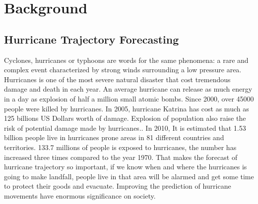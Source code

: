 \chapter{Background}
\label{sec:chapter2}

\section{Hurricane Trajectory Forecasting}
\label{sec:chapter2_1}
Cyclones, hurricanes or typhoons are words for the same phenomena: a rare and complex event characterized by strong winds surrounding a low pressure area. Hurricanes is one of the most severe natural disaster that cost tremendous damage and death in each year. An average hurricane can release as much energy in a day as explosion of half a million small atomic bombs. Since 2000, over 45000 people were killed by hurricanes. In 2005, hurricane Katrina has cost as much as 125 billions US Dollars worth of damage. Explosion of population also raise the risk of potential damage made by hurricanes.\cite{peduzzi2012global}. In 2010, It is estimated that 1.53 billion people live in hurricanes prone areas in 81 different countries and territories. 133.7 millions of people is exposed to hurricanes, the number has increased three times compared to the year 1970. That makes the forecast of hurricane trajectory so important, if we know when and where the hurricanes is going to make landfall, people live in that area will be alarmed and get some time to protect their goods and evacuate. Improving the prediction of hurricane movements have enormous significance on society.

